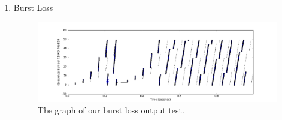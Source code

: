 \documentclass[11pt]{article}
\begin{document}
\begin{enumerate}

  \item Burst Loss

\begin{figure}[H]
\caption{The graph of our burst loss output test.}
	\label{figure4}
  	\centering
  	\includegraphics{figure4}
\end{figure}


\end{enumerate}
\end{document}
